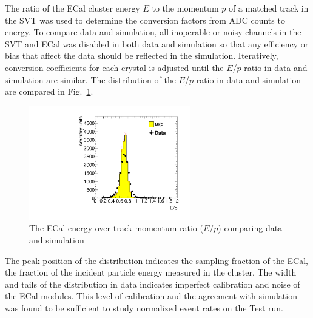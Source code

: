 \documentclass[final,3p,times,twocolumn]{elsarticle}
\begin{document}
The ratio of the ECal cluster energy $E$ to the momentum $p$ of a matched track in the SVT was used 
to determine the conversion factors from ADC counts to energy. To compare data and simulation, all 
inoperable or noisy channels in the SVT and ECal was disabled in both data and simulation so that any 
efficiency or bias that affect the data should be reflected in the simulation. 
Iteratively, conversion coefficients for each crystal is adjusted until the $E$/$p$ ratio in data and 
simulation are similar. The distribution of the $E$/$p$ ratio in data and simulation are compared in 
Fig.~\ref{fig:gains}. 
{\small
\begin{figure}[]
\begin{center}
	\includegraphics[width=7cm]{figures/h_ep_data_0_h_ep_MC_0_dataMC_1351-v6-v6gains_2-trig-top-cl600reg0.pdf}
	\caption{The ECal energy over track momentum ratio ($E$/$p$) comparing data and simulation} 
	\label{fig:gains}
\end{center}
\end{figure}
}
The peak position of the distribution indicates the sampling fraction of the ECal, the fraction of the 
incident particle energy measured in the cluster. The width and tails of the distribution 
in data indicates imperfect calibration and noise of the ECal modules. This level of calibration and the 
agreement with simulation was found to be sufficient to study normalized event rates on the Test run.
\end{document}
